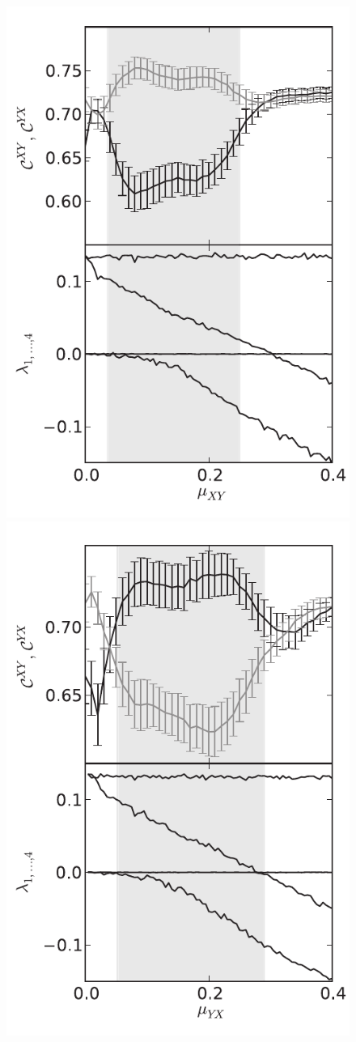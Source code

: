 \documentclass[graybox]{svmult}
\begin{document}


\begin{figure}
\centering
\includegraphics[width=.45\columnwidth]{FUN_XY.pdf} \hfill
\includegraphics[width=.45\columnwidth]{FUN_YX.pdf} 

\end{figure}
\end{document}
